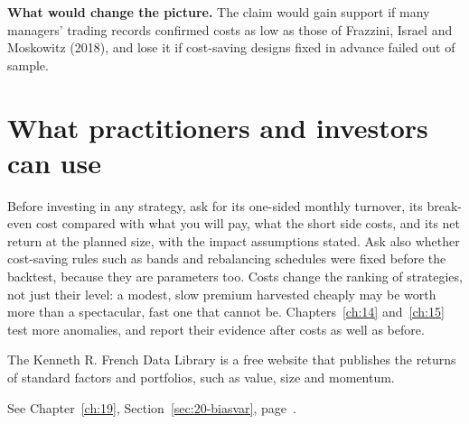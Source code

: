 \textbf{What would change the picture.} The claim would gain support if many managers' trading records confirmed costs as low as those of Frazzini, Israel and Moskowitz (2018), and lose it if cost-saving designs fixed in advance failed out of sample.

\section{What practitioners and investors can use}
\label{sec:17-investors}

Before investing in any strategy, ask for its one-sided monthly turnover, its break-even cost compared with what you will pay, what the short side costs, and its net return at the planned size, with the impact assumptions stated. Ask also whether cost-saving rules such as bands and rebalancing schedules were fixed before the backtest, because they are parameters too. Costs change the ranking of strategies, not just their level: a modest, slow premium harvested cheaply may be worth more than a spectacular, fast one that cannot be. Chapters~\ref{ch:14} and~\ref{ch:15} test more anomalies, and report their evidence after costs as well as before.

\makeatletter
{}
\makeatother

\begin{keyterms}
\small
\begin{description}[leftmargin=0pt, itemsep=2pt, parsep=0pt, font=\normalfont\bfseries\color{FEMaroon}]
  \item[Kenneth R. French Data Library.] The Kenneth R. French Data Library is a free website that publishes the returns of standard factors and portfolios, such as value, size and momentum.
  \item[Overfitting.] See Chapter~\ref{ch:19}, Section~\ref{sec:20-biasvar}, page~\pageref{sec:20-biasvar}.
\end{description}
\end{keyterms}
